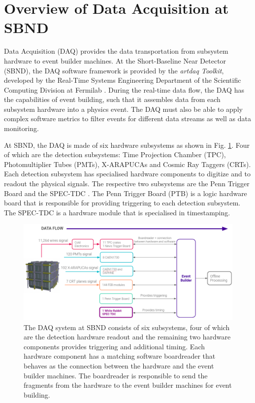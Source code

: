 \section{Overview of Data Acquisition at SBND}
\label{section5.1}

Data Acquisition (DAQ) provides the data transportation from subsystem hardware to event builder machines.
At the Short-Baseline Near Detector (SBND), the DAQ software framework is provided by the \textit{artdaq Toolkit}, developed by the Real-Time Systems Engineering Department of the Scientific Computing Division at Fermilab \cite{}.
During the real-time data flow, the DAQ has the capabilities of event building, such that it assembles data from each subsystem hardware into a physics event.
The DAQ must also be able to apply complex software metrics to filter events for different data streams as well as data monitoring.

At SBND, the DAQ is made of six hardware subsystems as shown in Fig. \ref{fig:daq_overview}. 
Four of which are the detection subsystems: Time Projection Chamber (TPC), Photomultiplier Tubes (PMTs), X-ARAPUCAs and Cosmic Ray Taggers (CRTs). 
Each detection subsystem has specialised hardware components to digitize and to readout the physical signals. 
The respective two subsystems are the Penn Trigger Board \cite{} and the SPEC-TDC \cite{}. 
The Penn Trigger Board (PTB) is a logic hardware board that is responsible for providing triggering to each detection subsystem.
The SPEC-TDC is a hardware module that is specialised in timestamping.


\begin{figure}[htbp!] 
\centering    
\includegraphics[width=1.0\textwidth]{DAQ_Overview}
\caption[DAQ_Overview]{The DAQ system at SBND consists of six subsystems, four of which are the detection hardware readout and the remaining two hardware components provides triggering and additional timing. Each hardware component has a matching software boardreader that behaves as the connection between the hardware and the event builder machines. The boardreader is responsible to send the fragments from the hardware to the event builder machines for event building.}
\label{fig:daq_overview}
\end{figure}

